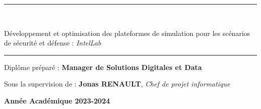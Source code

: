 \documentclass[a4paper, oneside, 12pt, final]{extreport}
\newcommand{\reportSubject} {
  Développement et optimisation des plateformes de simulation pour les scénarios de sécurité et défense : \textit{IntelLab} 
}
\newcommand{\AU} {
\centering \textbf{Année Académique 2023-2024}
}
\begin{document}
\begin{titlepage}
\begin{center}
    \vspace{10pt}

    \vspace{5pt} {
      \renewcommand*{\familydefault}{\defaultFont}
      \fontsize{27pt}{27pt}\selectfont%
      \rule{0.5\textwidth}{.4pt}\\
      \vspace{10pt}
      \reportSubject{}\\%
      \vspace{10pt}
      \rule{0.5\textwidth}{.4pt}
    }


    \vspace{30pt}
    {Diplôme préparé : \textbf{\large Manager de Solutions Digitales et Data}}\\
    \vspace{46pt}


    Sous la supervision de :  \textbf{Jonas RENAULT}, \textit{Chef de projet informatique}\\
    \vspace{50pt}

  \end{center}
  \vspace{40pt}
  \AU\\
\end{titlepage}

%
\end{document}
